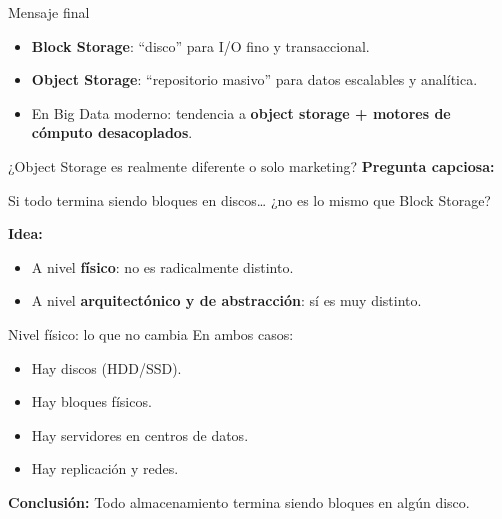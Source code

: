 \documentclass{beamer}
\begin{document}
\begin{frame}{Mensaje final}
\begin{itemize}
    \item \textbf{Block Storage}: “disco” para I/O fino y transaccional.
    \item \textbf{Object Storage}: “repositorio masivo” para datos escalables y analítica.
    \item En Big Data moderno: tendencia a \textbf{object storage + motores de cómputo desacoplados}.
\end{itemize}
\end{frame}


\begin{frame}{¿Object Storage es realmente diferente o solo marketing?}
\textbf{Pregunta capciosa:}

Si todo termina siendo bloques en discos…  
¿no es lo mismo que Block Storage?

\medskip

\textbf{Idea:}
\begin{itemize}
    \item A nivel \textbf{físico}: no es radicalmente distinto.
    \item A nivel \textbf{arquitectónico y de abstracción}: sí es muy distinto.
\end{itemize}
\end{frame}

\begin{frame}{Nivel físico: lo que no cambia}
En ambos casos:
\begin{itemize}
    \item Hay discos (HDD/SSD).
    \item Hay bloques físicos.
    \item Hay servidores en centros de datos.
    \item Hay replicación y redes.
\end{itemize}

\medskip
\textbf{Conclusión:} Todo almacenamiento termina siendo bloques en algún disco.
\end{frame}
\end{document}
